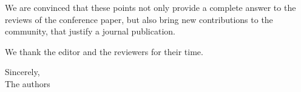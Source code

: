 \documentclass[a4paper]{article}
\begin{document}
We are convinced that these points not only provide a complete answer to
the reviews of the conference paper, but also bring new contributions to
the community, that justify a journal publication.


We thank the editor and the reviewers for their time.


Sincerely, \\

The authors


\end{document}
